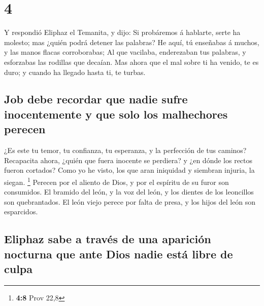 \hypertarget{section-3}{%
\section{4}\label{section-3}}

 Y respondió Eliphaz el Temanita, y dijo:  Si
probáremos á hablarte, serte ha molesto; mas ¿quién podrá detener las
palabras?  He aquí, tú enseñabas á muchos, y las manos
flacas corroborabas;  Al que vacilaba, enderezaban tus
palabras, y esforzabas las rodillas que decaían.  Mas ahora
que el mal sobre ti ha venido, te es duro; y cuando ha llegado hasta ti,
te turbas.

\hypertarget{job-debe-recordar-que-nadie-sufre-inocentemente-y-que-solo-los-malhechores-perecen}{%
\subsection{Job debe recordar que nadie sufre inocentemente y que solo
los malhechores
perecen}\label{job-debe-recordar-que-nadie-sufre-inocentemente-y-que-solo-los-malhechores-perecen}}

 ¿Es este tu temor, tu confianza, tu esperanza, y la
perfección de tus caminos?  Recapacita ahora, ¿quién que
fuera inocente se perdiera? y ¿en dónde los rectos fueron cortados?
 Como yo he visto, los que aran iniquidad y siembran
injuria, la siegan. \footnote{\textbf{4:8} Prov 22,8} 
Perecen por el aliento de Dios, y por el espíritu de su furor son
consumidos.  El bramido del león, y la voz del león, y los
dientes de los leoncillos son quebrantados.  El león viejo
perece por falta de presa, y los hijos del león son esparcidos.

\hypertarget{eliphaz-sabe-a-travuxe9s-de-una-apariciuxf3n-nocturna-que-ante-dios-nadie-estuxe1-libre-de-culpa}{%
\subsection{Eliphaz sabe a través de una aparición nocturna que ante
Dios nadie está libre de
culpa}\label{eliphaz-sabe-a-travuxe9s-de-una-apariciuxf3n-nocturna-que-ante-dios-nadie-estuxe1-libre-de-culpa}}

